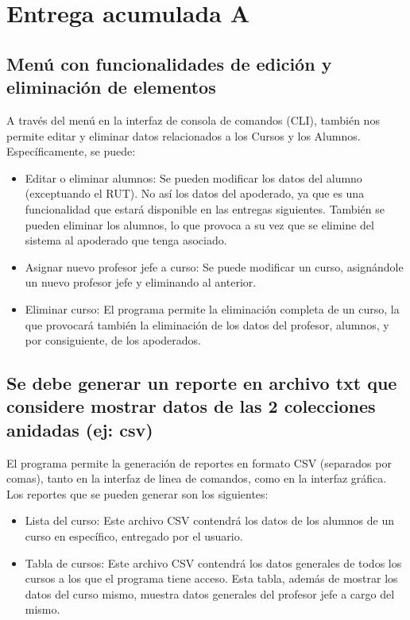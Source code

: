 \renewcommand\thesection{\Alph{section}}
\renewcommand\thesubsection{\thesection.\arabic{subsection}}
\setcounter{section}{0}
\section{Entrega acumulada A}

\setcounter{subsection}{1}
\subsection{Menú con funcionalidades de edición y eliminación de elementos}

A través del menú en la interfaz de consola de comandos (CLI), también nos permite editar y eliminar datos relacionados a los Cursos y los Alumnos. Específicamente, se puede:

\begin{itemize}
    \item Editar o eliminar alumnos: Se pueden modificar los datos del alumno (exceptuando el RUT). No así los datos del apoderado, ya que es una funcionalidad que estará disponible en las entregas siguientes. También se pueden eliminar los alumnos, lo que provoca a su vez que se elimine del sistema al apoderado que tenga asociado.

    \item Asignar nuevo profesor jefe a curso: Se puede modificar un curso, asignándole un nuevo profesor jefe y eliminando al anterior.
    \item Eliminar curso: El programa permite la eliminación completa de un curso, la que provocará también la eliminación de los datos del profesor, alumnos, y por consiguiente, de los apoderados.
\end{itemize}

\subsection{Se debe generar un reporte en archivo txt que considere mostrar datos de las 2 colecciones anidadas (ej: csv)}

El programa permite la generación de reportes en formato CSV (separados por comas), tanto en la interfaz de linea de comandos, como en la interfaz gráfica. Los reportes que se pueden generar son los siguientes:

\begin{itemize}
    \item Lista del curso: Este archivo CSV contendrá los datos de los alumnos de un curso en específico, entregado por el usuario.
    \item Tabla de cursos: Este archivo CSV contendrá los datos generales de todos los cursos a los que el programa tiene acceso. Esta tabla, además de mostrar los datos del curso mismo, muestra datos generales del profesor jefe a cargo del mismo.
\end{itemize}

